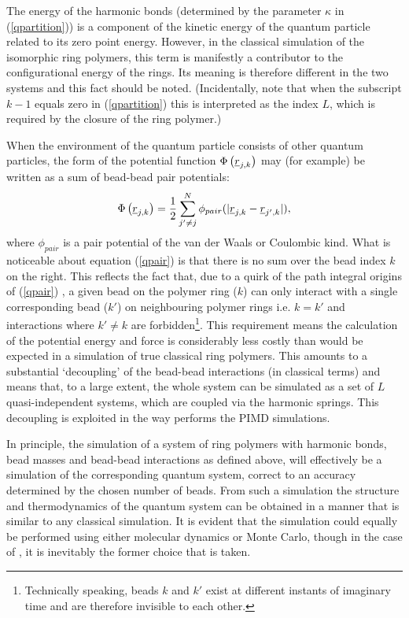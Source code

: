 The energy of the harmonic bonds (determined by the parameter $\kappa$
in (\ref{qpartition})) is a component of the kinetic energy of the
quantum particle related to its zero point energy.  However, in the
classical simulation of the isomorphic ring polymers, this term is
manifestly a contributor to the configurational energy of the
rings. Its meaning is therefore different in the two systems and this
fact should be noted. (Incidentally, note that when the subscript
$k-1$ equals zero in (\ref{qpartition}) this is interpreted as the
index $L$, which is required by the closure of the ring polymer.)

When the environment of the quantum particle consists of other quantum
particles, the form of the potential function $\Phi\left
(\mbox{$\underline{r}$}_{j,k}\right)$ may (for example) be written as a sum of
bead-bead pair potentials:
\begin{equation}
  \Phi\left (\mbox{$\underline{r}$}_{j,k}\right )= \frac{1}{2} \sum_{j' \ne j}^{N} \phi_{pair}
  ( |\mbox{$\underline{r}$}_{j,k}- \mbox{$\underline{r}$}_{j',k} |), \label{qpair}
\end{equation}
where $\phi_{pair}$ is a pair potential of the van der Waals or
Coulombic kind.  What is noticeable about equation (\ref{qpair}) is
that there is no sum over the bead index $k$ on the right. This
reflects the fact that, due to a quirk of the path integral origins of
(\ref{qpair}) \cite{smith-14}, a given bead on the polymer ring ($k$)
can only interact with a single corresponding bead ($k'$) on
neighbouring polymer rings i.e. $k=k'$ and interactions where $k'\ne
k$ are forbidden\footnote{Technically speaking, beads $k$ and $k'$
  exist at different instants of imaginary time and are therefore
  invisible to each other.}. This requirement means the calculation of
the potential energy and force is considerably less costly than would
be expected in a simulation of true classical ring polymers. This
amounts to a substantial `decoupling' of the bead-bead interactions
(in classical terms) and means that, to a large extent, the whole
system can be simulated as a set of $L$ quasi-independent systems,
which are coupled via the harmonic springs. This decoupling is
exploited in the way \DD{} performs the PIMD simulations.

In principle, the simulation of a system of ring polymers with harmonic
bonds, bead masses and bead-bead interactions as defined above, will
effectively be a simulation of the corresponding quantum system, correct to
an accuracy determined by the chosen number of beads. From such a
simulation the structure and thermodynamics of the quantum system can
be obtained in a manner that is similar to any classical simulation.
It is evident that the simulation could equally be performed using
either molecular dynamics or Monte Carlo, though in the case of \DD{},
it is inevitably the former choice that is taken.

